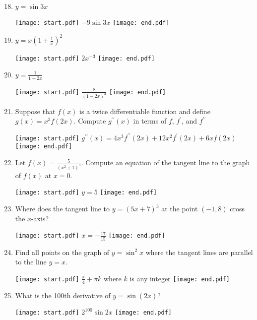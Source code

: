 \documentclass[12pt]{article}
\begin{document}
\begin{enumerate}
\setcounter{enumi}{17}

\item $y = \sin{3x}$ 

\texttt{[image: start.pdf]}
{{$-9\sin{3x}$}}
\texttt{[image: end.pdf]}


\item $y = x\left(1+\frac{1}{x}\right)^2$ 

\texttt{[image: start.pdf]}
{{$2x^{-3}$}}
\texttt{[image: end.pdf]}


\item $y = \frac{1}{1-2x}$ 

\texttt{[image: start.pdf]}
{{$\frac{8}{(1-2x)^3}$}}
\texttt{[image: end.pdf]}


\item  Suppose that $f(x)$ is a twice differentiable function and define $g(x)=x^3f(2x)$.  Compute $g^{\prime \prime}(x)$ in terms of $f$, $f^{\prime}$, and $f^{\prime \prime}$

\texttt{[image: start.pdf]}
{{$g^{\prime \prime}(x)=4x^3f^{\prime \prime}(2x)+12x^2f^{\prime}(2x)+6xf(2x)$}}
\texttt{[image: end.pdf]}


\item Let $f(x)=\frac{5}{(x^2+1)^3}$.  Compute an equation of the tangent line to the graph of $f(x)$ at $x=0$.

\texttt{[image: start.pdf]}
{{$y=5$}}
\texttt{[image: end.pdf]}


\item Where does the tangent line to $y=(5x+7)^3$ at the point $(-1,8)$ cross the $x$-axis?

\texttt{[image: start.pdf]}
{{$x=-\frac{17}{15}$}}
\texttt{[image: end.pdf]}


\item Find all points on the graph of $y=\sin^2{x}$ where the tangent lines are parallel to the line $y=x$.

\texttt{[image: start.pdf]}
{{$\frac{\pi}{4}+\pi k$ where $k$ is any integer}}
\texttt{[image: end.pdf]}


\item What is the 100th derivative of $y=\sin{(2x)}$?

\texttt{[image: start.pdf]}
{{$2^{100}\sin{2x}$}}
\texttt{[image: end.pdf]}


\newpage


\end{enumerate}
\end{document}
